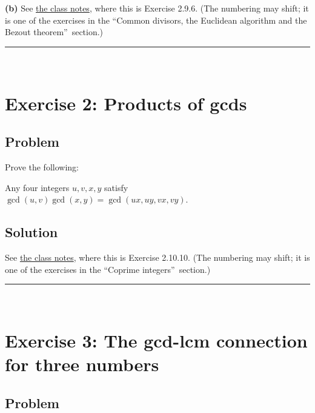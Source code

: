 \documentclass[paper=a4, fontsize=12pt]{scrartcl}%
\theoremstyle{plainsl}
\theoremstyle{definition}
\theoremstyle{remark}
\begin{document}
\textbf{(b)} See
\href{http://www.cip.ifi.lmu.de/~grinberg/t/19s/notes.pdf}{the class notes},
where this is Exercise 2.9.6. (The numbering may shift; it is one of the
exercises in the \textquotedblleft Common divisors, the Euclidean algorithm
and the Bezout theorem\textquotedblright\ section.)

\rule{\linewidth}{0.3pt} \\[0.4cm]

\section{Exercise 2: Products of gcds}

\subsection{Problem}

Prove the following:

Any four integers $u,v,x,y$ satisfy $\gcd\left(  u,v\right)  \gcd\left(
x,y\right)  =\gcd\left(  ux,uy,vx,vy\right)  $.

\subsection{Solution}

See \href{http://www.cip.ifi.lmu.de/~grinberg/t/19s/notes.pdf}{the class
notes}, where this is Exercise 2.10.10. (The numbering may shift; it is one of
the exercises in the \textquotedblleft Coprime integers\textquotedblright\ section.)

\rule{\linewidth}{0.3pt} \\[0.4cm]

\section{Exercise 3: The gcd-lcm connection for three numbers}

\subsection{Problem}
\end{document}
